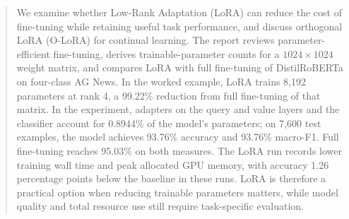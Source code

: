 \begin{abstract}
	We examine whether Low-Rank Adaptation (LoRA) can reduce the cost of
	fine-tuning while retaining useful task performance, and discuss
	orthogonal LoRA (O-LoRA) for continual learning. The report reviews
	parameter-efficient fine-tuning, derives trainable-parameter counts
	for a $1024 \times 1024$ weight matrix, and compares LoRA with full
	fine-tuning of DistilRoBERTa on four-class AG News. In the worked
	example, LoRA trains 8,192 parameters at rank 4, a 99.22\% reduction
	from full fine-tuning of that matrix. In the experiment, adapters on
	the query and value layers and the classifier account for 0.8944\% of
	the model's parameters; on 7,600 test examples, the model achieves
	93.76\% accuracy and 93.76\% macro-F1. Full fine-tuning reaches
	95.03\% on both measures. The LoRA run records lower training wall
	time and peak allocated GPU memory, with accuracy 1.26 percentage
	points below the baseline in these runs.
	LoRA is therefore a practical option when reducing trainable
	parameters matters, while model quality and total resource use still
	require task-specific evaluation.
\end{abstract}

